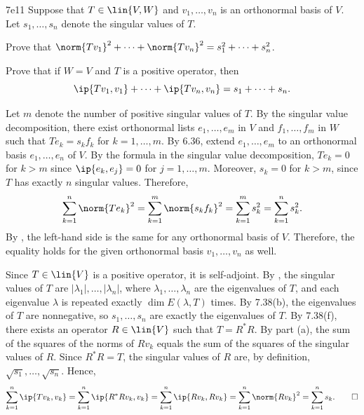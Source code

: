 \begin{exercise}{7e11}
    Suppose that $T \in \lin{V, W}$ and $v_1, \ldots, v_n$ is an orthonormal basis of $V$.
    Let $s_1, \ldots, s_n$ denote the singular values of $T$.
    \begin{subexercises}
        \item Prove that $\norm{Tv_1}^2 + \cdots + \norm{Tv_n}^2 = s_1^2 + \cdots + s_n^2$.
        \item Prove that if $W = V$ and $T$ is a positive operator, then
        \[
            \ip{Tv_1, v_1} + \cdots + \ip{Tv_n, v_n} = s_1 + \cdots + s_n.
        \]
    \end{subexercises}

\end{exercise}

\begin{solenum}
    \item Let $m$ denote the number of positive singular values of $T$.
    By the singular value decomposition, there exist orthonormal lists $e_1, \ldots, e_m$ in $V$ and $f_1, \ldots, f_m$ in $W$ such that $T e_k = s_k f_k$ for $k = 1, \ldots, m$.
    By 6.36, extend $e_1, \ldots, e_m$ to an orthonormal basis $e_1, \ldots, e_n$ of $V$.
    By the formula in the singular value decomposition, $T e_k = 0$ for $k > m$ since $\ip{e_k, e_j} = 0$ for $j = 1, \ldots, m$.
    Moreover, $s_k = 0$ for $k > m$, since $T$ has exactly $n$ singular values.
    Therefore,
    \[
        \sum_{k=1}^n \norm{T e_k}^2 = \sum_{k=1}^m \norm{s_k f_k}^2 = \sum_{k=1}^m s_k^2 = \sum_{k=1}^n s_k^2.
    \]
    By , the left-hand side is the same for any orthonormal basis of $V$.
    Therefore, the equality holds for the given orthonormal basis $v_1, \ldots, v_n$ as well.
    \item Since $T \in \lin{V}$ is a positive operator, it is self-adjoint.
    By , the singular values of $T$ are $|\lambda_1|, \ldots, |\lambda_n|$, where $\lambda_1, \ldots, \lambda_n$ are the eigenvalues of $T$, and each eigenvalue $\lambda$ is repeated exactly $\dim E(\lambda, T)$ times.
    By 7.38(b), the eigenvalues of $T$ are nonnegative, so $s_1, \ldots, s_n$ are exactly the eigenvalues of $T$.
    By 7.38(f), there exists an operator $R \in \lin{V}$ such that $T = R^\ast R$.
    By part (a), the sum of the squares of the norms of $R v_k$ equals the sum of the squares of the singular values of $R$.
    Since $R^\ast R = T$, the singular values of $R$ are, by definition, $\sqrt{s_1}, \ldots, \sqrt{s_n}$.
    Hence,
    \[
        \sum_{k=1}^n \ip{Tv_k, v_k} = \sum_{k=1}^n \ip{R^\ast R v_k, v_k} = \sum_{k=1}^n \ip{R v_k, R v_k} = \sum_{k=1}^n \norm{R v_k}^2 = \sum_{k=1}^n s_k. \qedhere
    \]
\end{solenum}

